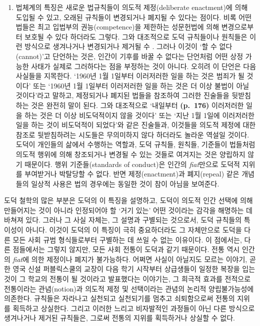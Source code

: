 \begin{enumerate}
\def\labelenumi{(\roman{enumi})}
\setcounter{enumi}{1}
\tightlist
\item
  법체계의 특징은 새로운 법규칙들이 의도적 제정(deliberate enactment)에
  의해 도입될 수 있고, 오래된 규칙들이 변경되거나 폐지될 수 있다는
  점이다. 비록 어떤 법들은 최고 입법부의 권능(competence)을 제한하는
  성문헌법에 의해 변경으로부터 보호될 수 있다 하더라도 그렇다. 그와
  대조적으로 도덕 규칙들이나 원칙들은 이런 방식으로 생겨나거나
  변경되거나 제거될 수 . 그러나 이것이 ‘할 수 없다(cannot)’고
  단언하는 것은, 인간이 기후를 바꿀 수 없다는 단언처럼 어떤 상정 가능한
  사태가 실제로 그러하다는 점을 부정하는 것이 아니다. 오히려 이 단언은
  다음 사실들을 지목한다. ‘1960년 1월 1일부터 이러저러한 일을 하는 것은
  범죄가 될 것이다’ 또는 ‘1960년 1월 1일부터 이러저러한 일을 하는 것은
  더 이상 불법이 아닐 것이다’라고 말하고, 제정되거나 폐지된 법들을
  참조하여 그러한 진술들을 뒷받침하는 것은 완전히 말이 된다. 그와
  대조적으로 ‘내일부터 \textbf{(p.~176)} 이러저러한 일을 하는 것은 더
  이상 비도덕적이지 않을 것이다’ 또는 ‘지난 1월 1일에 이러저러한 일을
  하는 것이 비도덕적이 되었다’와 같은 진술들과, 이것들을 의도적 제정에
  대한 참조로 뒷받침하려는 시도들은 무의미하지 않다 하더라도 놀라운
  역설일 것이다. 도덕이 개인들의 삶에서 수행하는 역할과, 도덕 규칙들,
  원칙들, 기준들이 법들처럼 의도적 행위에 의해 창조되거나 변경될 수 있는
  것들로 여겨지는 것은 양립하지 않기 때문이다. 행위 기준들(standards of
  conduct)은 인간의 \emph{fiat}만으로 도덕적 지위를 부여받거나 박탈당할
  수 없다. 반면 제정(enactment)과 폐지(repeal) 같은 개념들의 일상적
  사용은 법의 경우에는 동일한 것이 참이 아님을 보여준다.
\end{enumerate}

도덕 철학의 많은 부분은 도덕의 이 특징을 설명하고, 도덕이 의도적 인간
선택에 의해 만들어지는 것이 아니라 인정되어야 할 ‘거기 있는’ 어떤
것이라는 감각을 해명하는 데 바쳐져 있다. 그러나 그 사실 자체는, 그
설명과 구별되는 것으로서, 도덕 규칙들의 특이성이 아니다. 이것이 도덕의
이 특징이 극히 중요하더라도 그 자체만으로 도덕을 다른 모든 사회 규범
형식들로부터 구별하는 데 쓰일 수 없는 이유이다. 이 점에서는, 다른
점들에서는 그렇지 않지만, 모든 사회 전통이 도덕과 같기 때문이다. 전통
역시 인간의 \emph{fiat}에 의한 제정이나 폐지가 불가능하다. 어쩌면 사실이
아닐지도 모르는 이야기, 곧 한 영국 신설 퍼블릭스쿨의 교장이 다음 학기
시작부터 상급생들이 일정한 복장을 입는 것이 그 학교의 전통이 될 것이라고
발표했다는 이야기는, 그 희극적 효과를 전적으로 전통이라는 관념(notion)과
의도적 제정 및 선택이라는 관념의 논리적 양립불가능성에 의존한다.
규칙들은 자라나고 실천되고 실천되기를 멈추고 쇠퇴함으로써 전통의 지위를
획득하고 상실한다. 그리고 이러한 느리고 비자발적인 과정들이 아닌 다른
방식으로 생겨나거나 제거된 규칙들은, 그로써 전통의 지위를 획득하거나
상실할 수 없다.

